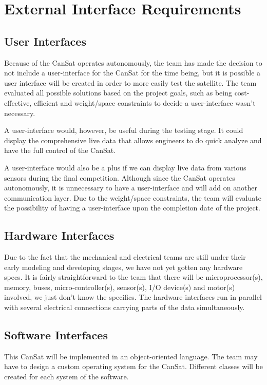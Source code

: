 \documentclass[10pt,onecolumn,draftclsnofoot,document]{IEEEtran}
\begin{document}
\section{External Interface Requirements}
\subsection{User Interfaces}
Because of the CanSat operates autonomously, the team has made the decision to not include a user-interface for the CanSat for the time being, but it is possible a user interface will be created in order to more easily test the satellite. The team evaluated all possible solutions based on the project goals, such as being cost-effective, efficient and weight/space constraints to decide a user-interface wasn't necessary.\\
\par
A user-interface would, however, be useful during the testing stage. It could display the comprehensive live data that allows engineers to do quick analyze and have the full control of the CanSat. \\
\par
A user-interface would also be a plus if we can display live data from various sensors during the final competition. Although since the CanSat operates autonomously, it is unnecessary to have a user-interface and will add on another communication layer. Due to the weight/space constraints, the team will evaluate the possibility of having a user-interface upon the completion date of the project.

\subsection{Hardware Interfaces}
Due to the fact that the mechanical and electrical teams are still under their early modeling and developing stages, we have not yet gotten any hardware specs. It is fairly straightforward to the team that there will be microprocessor(s), memory, buses, micro-controller(s), sensor(s), I/O device(s) and motor(s) involved, we just don't know the specifics. The hardware interfaces run in parallel with several electrical connections carrying parts of the data simultaneously.

\subsection{Software Interfaces}
This CanSat will be implemented in an object-oriented language. The team may have to design a custom operating system for the CanSat. Different classes will be created for each system of the software.
\end{document}
